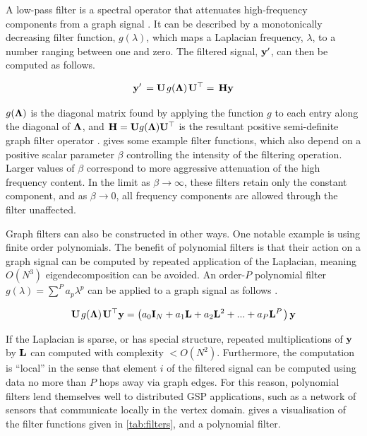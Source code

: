 A low-pass filter is a spectral operator that attenuates high-frequency components from a graph signal \citep{Ricaud2019}. It can be described by a monotonically decreasing filter function, $g(\lambda)$, which maps a Laplacian frequency, $\lambda$, to a number ranging between one and zero. The filtered signal, $\mathbf{y}'$, can then be computed as follows. 


\begin{equation}
    \mathbf{y}' \, =\mathbf{U} \mkern 2mu g(\mathbf{\Lambda}) \mkern 2mu \mathbf{U}^\top = \, \mathbf{H} \mathbf{y}
\end{equation}


$g(\mathbf{\Lambda})$ is the diagonal matrix found by applying the function $g$ to each entry along the diagonal of $\mathbf{\Lambda}$, and $\mathbf{H} = \mathbf{U} g(\mathbf{\Lambda}) \mathbf{U}^\top$ is the resultant positive semi-definite graph filter operator \citep{Isufi2022}.  gives some example filter functions, which also depend on a positive scalar parameter $\beta$ controlling the intensity of the filtering operation. Larger values of $\beta$ correspond to more aggressive attenuation of the high frequency content. In the limit as $\beta \rightarrow \infty$, these filters retain only the constant component, and as $\beta \rightarrow 0$, all frequency components are allowed through the filter unaffected. 

Graph filters can also be constructed in other ways. One notable example is using finite order polynomials. The benefit of polynomial filters is that their action on a graph signal can be computed by repeated application of the Laplacian, meaning $O(N^3)$ eigendecomposition can be avoided. An order-$P$ polynomial filter $g(\lambda) = \sum^P a_p \lambda^p$ can be applied to a graph signal as follows \citep{Susnjara2015}. 

\begin{equation}
    \mathbf{U} \mkern 2mu g(\mathbf{\Lambda}) \mkern 2mu \mathbf{U}^\top \mathbf{y} = \big(a_0 \mathbf{I}_N + a_1 \mathbf{L} + a_2 \mathbf{L}^2 + ... + a_P \mathbf{L}^P \mkern 2mu \big) \, \mathbf{y}
\end{equation}

If the Laplacian is sparse, or has special structure, repeated multiplications of $\mathbf{y}$ by $\mathbf{L}$ can computed with complexity $ < O(N^2)$. Furthermore, the computation is ``local'' in the sense that element $i$ of the filtered signal can be computed using data no more than $P$ hops away via graph edges. For this reason, polynomial filters lend themselves well to distributed GSP applications, such as a network of sensors that communicate locally in the vertex domain.  gives a visualisation of the filter functions given in \cref{tab:filters}, and a polynomial filter. 

